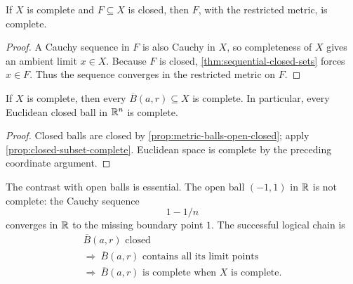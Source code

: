 \begin{proposition}
\label{prop:closed-subset-complete}
If $X$ is complete and $F\subseteq X$ is closed, then $F$, with the
restricted metric, is complete.
\end{proposition}
\begin{proof}
A Cauchy sequence in $F$ is also Cauchy in $X$, so completeness of $X$
gives an ambient limit $x\in X$. Because $F$ is closed,
\cref{thm:sequential-closed-sets} forces $x\in F$. Thus the sequence
converges in the restricted metric on $F$.
\end{proof}
\begin{corollary}
\label{cor:closed-ball-complete}
If $X$ is complete, then every $\overline B(a,r)\subseteq X$ is complete.
In particular, every Euclidean closed ball in $\mathbb{R}^n$ is complete.
\end{corollary}
\begin{proof}
Closed balls are closed by \cref{prop:metric-balls-open-closed}; apply
\cref{prop:closed-subset-complete}. Euclidean space is complete by the
preceding coordinate argument.
\end{proof}
The contrast with open balls is essential. The open ball $(-1,1)$ in
$\mathbb{R}$ is not complete: the Cauchy sequence
\[
1-1/n
\]
 converges in $\mathbb{R}$ to
the missing boundary point $1$. The successful logical chain is
\[
\boxed{
\begin{gathered}
\overline B(a,r)\text{ closed}\\
\Longrightarrow\ \overline B(a,r)\text{ contains all its limit points}\\
\Longrightarrow\ \overline B(a,r)\text{ is complete when }X\text{ is complete}.
\end{gathered}}
\]

